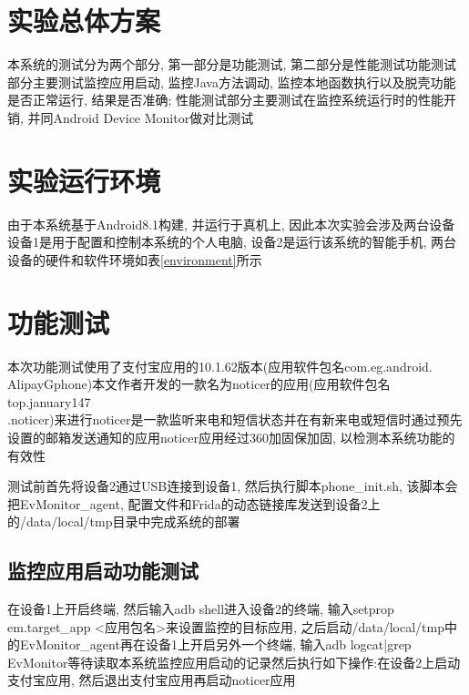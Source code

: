 \section{实验总体方案}
本系统的测试分为两个部分, 第一部分是功能测试, 第二部分是性能测试\juhao 功能测试部分主要测试监控应用启动, 监控Java方法调动, 监控本地函数执行以及脱壳功能是否正常运行, 结果是否准确; 性能测试部分主要测试在监控系统运行时的性能开销, 并同Android Device Monitor做对比测试\juhao 
\section{实验运行环境}
由于本系统基于Android8.1构建, 并运行于真机上, 因此本次实验会涉及两台设备\juhao 设备1是用于配置和控制本系统的个人电脑, 设备2是运行该系统的智能手机, 两台设备的硬件和软件环境如表\ref{environment}所示\juhao

\begin{table}[ht]
	\centering
	\caption{实验设备环境}
	\label{environment}
\end{table}
\section{功能测试}
本次功能测试使用了支付宝应用的10.1.62版本(应用软件包名com.eg.android.\\AlipayGphone)本文作者开发的一款名为noticer的应用(应用软件包名top.january147\\.noticer)来进行\juhao noticer是一款监听来电和短信状态并在有新来电或短信时通过预先设置的邮箱发送通知的应用\juhao noticer应用经过360加固保加固, 以检测本系统功能的有效性\juhao 

测试前首先将设备2通过USB连接到设备1, 然后执行脚本phone\_init.sh, 该脚本会把EvMonitor\_agent, 配置文件和Frida的动态链接库发送到设备2上的/data/local/tmp目录中完成系统的部署\juhao 
\subsection{监控应用启动功能测试}
在设备1上开启终端, 然后输入adb shell进入设备2的终端, 输入setprop em.target\_app <应用包名>来设置监控的目标应用, 之后启动/data/local/tmp中的EvMonitor\_agent\juhao 再在设备1上开启另外一个终端, 输入adb logcat|grep EvMonitor等待读取本系统监控应用启动的记录\juhao 然后执行如下操作:在设备2上启动支付宝应用, 然后退出支付宝应用再启动noticer应用\juhao

